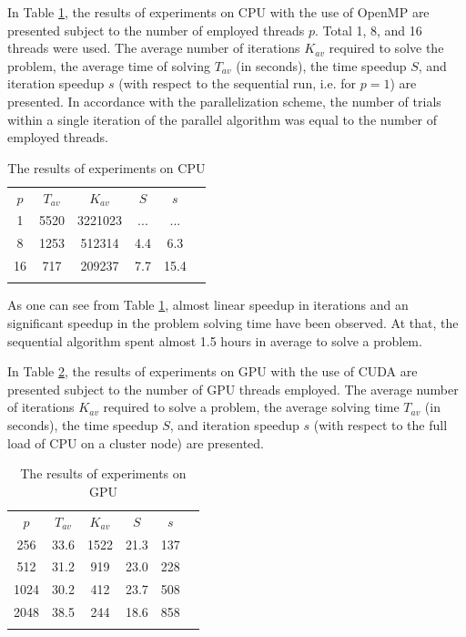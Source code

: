 \documentclass[runningheads]{llncs}
\begin{document}
In Table \ref{tab:2}, the results of experiments on CPU with the use of OpenMP are presented
subject to the number of employed threads $p$. Total 1, 8, and 16 threads were used. The
average number of iterations $K_{av}$ required to solve the problem, the average time of
solving $T_{av}$ (in seconds), the time speedup $S$, and iteration speedup $s$ (with respect
to the sequential run, i.e. for $p=1$) are presented. In accordance with the parallelization
scheme, the number of trials within a single iteration of the parallel algorithm was equal to the
number of employed threads.

\begin{table}
	\caption{The results of experiments on CPU}
	\label{tab:2}
	\center
	\begin{tabular}{cccccc}
		\hline\noalign{\smallskip}
		$p$ & $T_{av}$ & $K_{av}$ & $S$ & $s$ \\
	\noalign{\smallskip} \hline \noalign{\smallskip}
	1 \;&	5520 \;  & 3221023 \;  & ...\; & ...  \\
	8 \;&	1253 \; & 512314 \;  & 4.4\; & 6.3  \\
	16\;&  717 \; &  209237 \; & 7.7\; & 15.4 \\
		\noalign{\smallskip}\hline
	\end{tabular}
\end{table}

As one can see from Table \ref{tab:2}, almost linear speedup in iterations and an significant
speedup in the problem solving time have been observed. At that, the sequential algorithm spent
almost 1.5 hours in average to solve a problem.

In Table \ref{tab:3}, the results of experiments on GPU with the use of CUDA are presented
subject to the number of GPU threads employed. The average number of iterations $K_{av}$
required to solve a problem, the average solving time $T_{av}$ (in seconds), the time speedup
$S$, and iteration speedup $s$ (with respect to the full load of CPU on a cluster node) are
presented.

\begin{table}
	\caption{The results of experiments on GPU}
	\label{tab:3}
	\center
	\begin{tabular}{cccccc}
		\hline\noalign{\smallskip}
			$p$ & $T_{av}$ & $K_{av}$ & $S$ & $s$ \\
	\noalign{\smallskip} \hline \noalign{\smallskip}
	256 \;&	33.6 \; & 1522\;  & 21.3 \; & 137  \\
	512 \;&	31.2 \; & 919 \;  & 23.0 \; & 228  \\
	1024\;& 30.2 \; & 412 \; & 23.7  \; & 508  \\
	2048\;& 38.5 \; & 244 \; & 18.6  \; & 858  \\
		\noalign{\smallskip}\hline
	\end{tabular}
\end{table}
\end{document}

